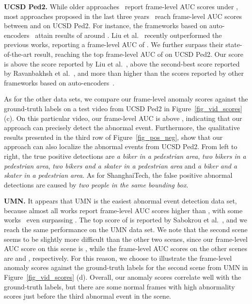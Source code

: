 \documentclass[10pt,twocolumn,letterpaper]{article}
\begin{document}
\noindent
{\bf UCSD Ped2.}
While older approaches~\cite{Kim-CVPR-2009,Mehran-CVPR-2009} report frame-level AUC scores under , most  approaches proposed in the last three years~\cite{Hasan-CVPR-2016,Hinami-ICCV-2017,Liu-CVPR-2018,Liu-BMVC-2018,Luo-ICCV-2017,Ravanbakhsh-WACV-2018,Ravanbakhsh-ICIP-2017,Xu-CVIU-2017,Zhang-PR-2016} reach frame-level AUC scores between  and  on UCSD Ped2. For instance, the frameworks based on auto-encoders~\cite{Hasan-CVPR-2016,Xu-BMVC-2015,Xu-CVIU-2017} attain results of around . Liu et al.~\cite{Liu-CVPR-2018} recently outperformed the previous works, reporting a frame-level AUC of . We further surpass their state-of-the-art result, reaching the top frame-level AUC of  on UCSD Ped2. Our score is  above the score reported by Liu et al.~\cite{Liu-CVPR-2018},  above the second-best score reported by Ravanbakhsh et al.~\cite{Ravanbakhsh-ICIP-2017}, and more than  higher than the scores reported by other frameworks based on auto-encoders~\cite{Hasan-CVPR-2016,Xu-BMVC-2015,Xu-CVIU-2017}.

As for the other data sets, we compare our frame-level anomaly scores against the ground-truth labels on a test video from UCSD Ped2 in Figure~\ref{fig_vid_scores} (c). On this particular video, our frame-level AUC is above , indicating that our approach can precisely detect the abnormal event. Furthermore, the qualitative results presented in the third row of Figure~\ref{fig_pos_neg}, show that our approach can also localize the abnormal events from UCSD Ped2. From left to right, the true positive detections are \emph{a biker in a pedestrian area}, \emph{two bikers in a pedestrian area}, \emph{two bikers and a skater in a pedestrian area} and \emph{a biker and a skater in a pedestrian area}. As for ShanghaiTech, the false positive abnormal detections are caused by \emph{two people in the same bounding box}. 

\noindent
{\bf UMN.}
It appears that UMN is the easiest abnormal event detection data set, because almost all works report frame-level AUC scores higher than , with some works~\cite{Dutta-AAAI-2015,Ravanbakhsh-ICIP-2017,Sabokrou-IP-2017} even surpassing . The top score of  is reported by Sabokrou et al.~\cite{Sabokrou-IP-2017}, and we reach the same performance on the UMN data set. We note that the second scene seems to be slightly more difficult than the other two scenes, since our frame-level AUC score on this scene is , while the frame-level AUC scores on the other scenes are  and , respectively. For this reason, we choose to illustrate the frame-level anomaly scores against the ground-truth labels for the second scene from UMN in Figure~\ref{fig_vid_scores} (d). Overall, our anomaly scores correlate well with the ground-truth labels, but there are some normal frames with high abnormality scores just before the third abnormal event in the scene. 
\end{document}
